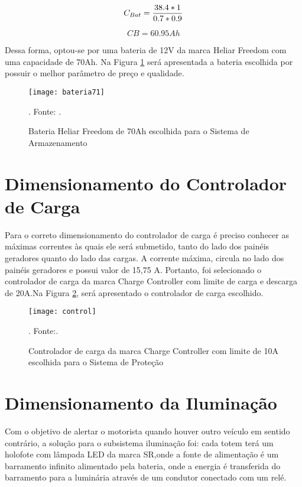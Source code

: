 \begin{equation}
    C_{Bat} = \frac{38.4*1}{0.7*0.9}\\
\end{equation}

\begin{equation}
    CB = 60.95 Ah
\end{equation}


Dessa forma, optou-se por uma bateria de 12V da marca Heliar Freedom com uma capacidade de 70Ah. Na Figura \ref{fig:bateria71} será apresentada a bateria escolhida por possuir o melhor parâmetro de preço e qualidade.


\begin{figure}[H]
\centering
\texttt{[image: bateria71]}
\caption{Bateria Heliar Freedom de 70Ah escolhida para o Sistema de Armazenamento}. Fonte: \cite{bateria70}.
\label{fig:bateria71}
\end{figure}
\FloatBarrier

\section{Dimensionamento do Controlador de Carga}

Para o correto dimensionamento do controlador de carga é preciso conhecer as máximas correntes às quais ele será submetido, tanto do lado dos painéis geradores quanto do lado das cargas. A corrente máxima, circula no lado dos painéis geradores e possui valor de 15,75 A. Portanto, foi selecionado o controlador de carga da marca Charge Controller com limite de carga e descarga de 20A.Na Figura \ref{fig:control}, será apresentado o controlador de carga escolhido.

\begin{figure}[H]
\centering
\texttt{[image: control]}
    \caption{Controlador de carga da marca Charge Controller com limite de 10A escolhida para o Sistema de Proteção}. Fonte:\cite{controlador}.
\label{fig:control}
\end{figure}
\FloatBarrier

\section{Dimensionamento da Iluminação}

Com o objetivo de alertar o motorista quando houver outro veículo em sentido contrário, a solução para o subsistema iluminação foi: cada totem terá um holofote com lâmpada LED da marca SR,onde a fonte de alimentação é um barramento infinito alimentado pela bateria, onde a energia é transferida do barramento para a luminária através de um condutor conectado com um relé. 


